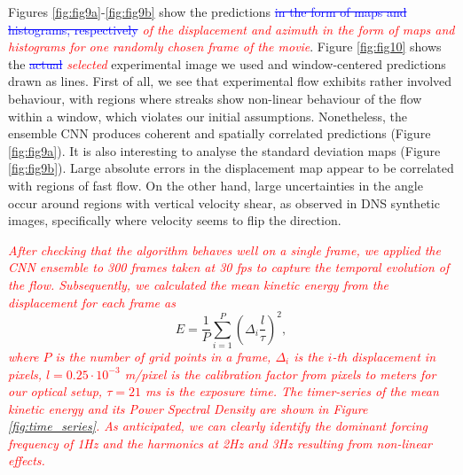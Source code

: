 \documentclass{svjour3}                     %
\newcommand{\new}[1]{\textit{\textcolor{red}{#1}}}
\newcommand{\old}[1]{\textcolor{blue}{\sout{#1}}}
\begin{document}
Figures \ref{fig:fig9a}-\ref{fig:fig9b} show the predictions \old{in the form of maps and histograms, respectively}\new{ of the displacement and azimuth in the form of maps and histograms for one randomly chosen frame of the movie}. Figure \ref{fig:fig10} shows the \old{actual} \new{selected} experimental image we used and window-centered predictions drawn as lines. First of all, we see that experimental flow exhibits rather involved behaviour, with regions where streaks show non-linear behaviour of the flow within a window, which violates our initial assumptions. Nonetheless, the ensemble CNN produces coherent and spatially correlated predictions (Figure \ref{fig:fig9a}). It is also interesting to analyse the standard deviation maps (Figure \ref{fig:fig9b}). Large absolute errors in the displacement map appear to be correlated with regions of fast flow. On the other hand, large uncertainties in the angle occur around regions with vertical velocity shear, as observed in DNS synthetic images, specifically where velocity seems to flip the direction.

\new{After checking that the algorithm behaves well on a single frame, we applied the CNN ensemble to 300 frames taken at 30 fps to capture the temporal evolution of the flow. Subsequently, we calculated the mean kinetic energy from the displacement for each frame as }
%
\begin{equation}
E = \frac{1}{P}\sum_{i=1}^{P}\left(\Delta_i \frac{l}{\tau}\right)^2,
\end{equation}
%
\new{where $P$ is the number of grid points in a frame, $\Delta_i$ is the $i$-th displacement in pixels, $l = 0.25\cdot 10^{-3}$ m/pixel is the calibration factor from pixels to meters for our optical setup, $\tau = 21$ ms is the exposure time. The timer-series of the mean kinetic energy and its Power Spectral Density are shown in Figure \ref{fig:time_series}. As anticipated, we can clearly identify the dominant forcing frequency of 1Hz and the harmonics at 2Hz and 3Hz resulting from non-linear effects.} 
\end{document}

